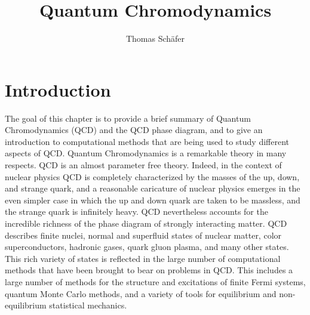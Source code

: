 \title{Quantum Chromodynamics}
\author{Thomas Sch\"afer}

\maketitle
{}


\newcommand {\bea}{\begin{eqnarray}}
\newcommand {\eea}{\end{eqnarray}}
\newcommand {\be}{\begin{equation}}
\newcommand {\ee}{\end{equation}}
\newcommand {\qslash}{q\!\!\!/}
\newcommand {\muslash}{\mu\!\!\!/}
\newcommand {\Dslash}{D\!\!\!/}
\newcommand {\bc}{\begin{center}}
\newcommand {\ec}{\end{center}}
\def\lsim{\mathrel{\rlap{\lower4pt\hbox{\hskip1pt$\sim$}}
    \raise1pt\hbox{$<$}}}               
\def\gsim{\mathrel{\rlap{\lower4pt\hbox{\hskip1pt$\sim$}}
    \raise1pt\hbox{$>$}}}  



\section{Introduction}

 The goal of this chapter is to provide a brief summary of Quantum 
Chromodynamics (QCD) and the QCD phase diagram, and to give an introduction 
to computational methods that are being used to study different aspects of 
QCD. Quantum Chromodynamics is a remarkable theory in many respects. QCD 
is an almost parameter free theory. Indeed, in the context of nuclear 
physics QCD is completely characterized by the masses of the up, down,
and strange quark, and a reasonable caricature of nuclear physics emerges
in the even simpler case in which the up and down quark are taken to
be massless, and the strange quark is infinitely heavy. QCD nevertheless
accounts for the incredible richness of the phase diagram of strongly 
interacting matter. QCD describes finite nuclei, normal and superfluid 
states of nuclear matter, color superconductors, hadronic gases, quark 
gluon plasma, and many other states. This rich variety of states is
reflected in the large number of computational methods that have been 
brought to bear on problems in QCD. This includes a large number 
of methods for the structure and excitations of finite Fermi systems, 
quantum Monte Carlo methods, and a variety of tools for equilibrium
and non-equilibrium statistical mechanics. 

